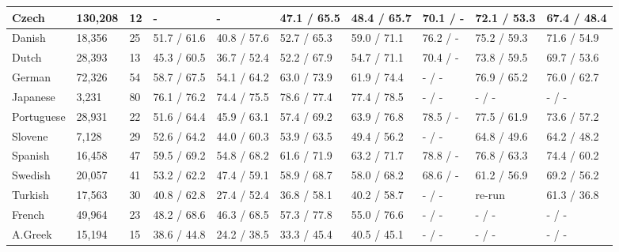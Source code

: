 \begin{table}
\begin{tabular}{|l|l|l|l|l|l|l|l|l|l|}
        Czech      & 130,208 & 12   & -             & -            & 47.1 / 65.5   & 48.4 / 65.7    & 70.1 / -    & 72.1 / 53.3     & 67.4 / 48.4 \\ \hline
        Danish     & 18,356  & 25   & 51.7 / 61.6   & 40.8 / 57.6   & 52.7 / 65.3   & 59.0 / 71.1   & 76.2 / -    & 75.2 / 59.3     & 71.6 / 54.9 \\ \hline
        Dutch      & 28,393  & 13   & 45.3 / 60.5   & 36.7 / 52.4   & 52.2 / 67.9   & 54.7 / 71.1   & 70.4 / -    & 73.8 / 59.5     & 69.7 / 53.6 \\ \hline
        German     & 72,326  & 54   & 58.7 / 67.5   & 54.1 / 64.2   & 63.0 / 73.9   & 61.9 / 74.4   & - / -       & 76.9 / 65.2     & 76.0 / 62.7 \\ \hline
        Japanese   & 3,231   & 80   & 76.1 / 76.2   & 74.4 / 75.5   & 78.6 / 77.4   & 77.4 / 78.5   & - / -       & - / -           & - / -       \\ \hline
        Portuguese & 28,931  & 22   & 51.6 / 64.4   & 45.9 / 63.1   & 57.4 / 69.2   & 63.9 / 76.8   & 78.5 / -    & 77.5 / 61.9     & 73.6 / 57.2 \\ \hline
        Slovene    & 7,128   & 29   & 52.6 / 64.2   & 44.0 / 60.3   & 53.9 / 63.5   & 49.4 / 56.2   & - / -       & 64.8 / 49.6     & 64.2 / 48.2 \\ \hline
        Spanish    & 16,458  & 47   & 59.5 / 69.2   & 54.8 / 68.2   & 61.6 / 71.9   & 63.2 / 71.7   & 78.8 / -    & 76.8 / 63.3     & 74.4 / 60.2 \\ \hline
        Swedish    & 20,057  & 41   & 53.2 / 62.2   & 47.4 / 59.1   & 58.9 / 68.7   & 58.0 / 68.2   & 68.6 / -    & 61.2 / 56.9     & 69.2 / 56.2 \\ \hline
        Turkish    & 17,563  & 30   & 40.8 / 62.8   & 27.4 / 52.4   & 36.8 / 58.1   & 40.2 / 58.7   & - / -       & re-run          & 61.3 / 36.8 \\ \hline
        French     & 49,964  & 23   & 48.2 / 68.6   & 46.3 / 68.5   & 57.3 / 77.8   & 55.0 / 76.6   & - / -       & - / -           & - / -       \\ \hline
        A.Greek    & 15,194  & 15   & 38.6 / 44.8   & 24.2 / 38.5   & 33.3 / 45.4  & 40.5 / 45.1    & - / -       & - / -           & - / -       \\ \hline
        \hline
    \end{tabular}
\end{table}
